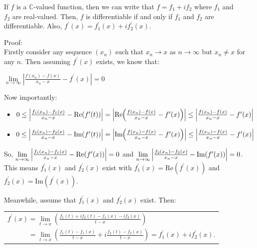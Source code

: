 \documentclass{book}
\newcommand{\exTwo}{%
   \color{RedViolet}%
   \fontsize{13}{15}\selectfont%
}
\newcommand{\exP}{%
   \color{VioletRed}%
   \fontsize{12}{14}\selectfont%
}
\newenvironment{myIndent}{%
   \begin{adjustwidth}{2.5em}{0em}%
}{%
   \end{adjustwidth}%
}
\newcommand{\rea}[1]{\mathrm{Re}(#1)}
\newcommand{\ima}[1]{\mathrm{Im}(#1)}
\newcommand{\retTwo}{\hfill\bigbreak}
\begin{document}
If $f$ is a $\mathbb{C}$-valued function, then we can write that $f = f_1 + if_2$ where $f_1$ and\\ $f_2$ are real-valued. Then, $f$ is differentiable if and only if $f_1$ and $f_2$ are\\ differentiable. Also, $f^\prime(x) = f_1^\prime(x) + if_2^\prime(x)$.\retTwo

{\begin{myIndent}\exTwo\color{Purple}
   Proof:\\
   Firstly consider any sequence $(x_n)$ such that $x_n \rightarrow x$ as $n \rightarrow \infty$ but $x_n \neq x$ for\\ any $n$. Then assuming  $f^\prime(x)$ exists, we know that:

   {\centering $\lim\limits_{n\rightarrow\infty}\left|\frac{f(x_n) - f(x)}{x_n-x} - f^\prime(x)\right| = 0$ \retTwo\par}

   Now importantly:
   {\begin{itemize}\exP\color{RedViolet}
      \item $0 \leq \left|\frac{f_1(x_n) - f_1(x)}{x_n - x} - \rea{f^\prime(t)}\right| = \left|\mathrm{Re}\hspace{-0.24em}\left(\frac{f(x_n) - f(x)}{x_n - x} - f^\prime(x) \right)\right| \leq \left|\frac{f(x_n) - f(x)}{x_n-x} - f^\prime(x)\right|$
      \item $0 \leq \left|\frac{f_2(x_n) - f_2(x)}{x_n - x} - \ima{f^\prime(t)}\right| = \left|\mathrm{Im}\hspace{-0.24em}\left(\frac{f(x_n) - f(x)}{x_n - x} - f^\prime(x) \right)\right| \leq \left|\frac{f(x_n) - f(x)}{x_n-x} - f^\prime(x)\right|$\\
   \end{itemize}}

   So, ${\fontsize{12}{14}\selectfont\lim\limits_{n\rightarrow\infty}\left|\frac{f_1(x_n) - f_1(x)}{x_n-x} - \rea{f^\prime(x)}\right| = 0}$ and ${\fontsize{12}{14}\selectfont\lim\limits_{n\rightarrow\infty}\left|\frac{f_2(x_n) - f_2(x)}{x_n-x} - \ima{f^\prime(x)}\right| = 0}$.\\ [2pt]
   This means $f_1^\prime(x)$ and $f_2^\prime(x)$ exist with $f_1^\prime(x) = \rea{f^\prime(x)}$ and $f_2^\prime(x) = \ima{f^\prime(x)}$.\retTwo

   Meanwhile, assume that $f_1^\prime(x)$ and $f_2^\prime(x)$ exist. Then:

   {\centering\exP\color{RedViolet} 
   \begin{tabular}{l}
      $f^\prime(x) = \lim\limits_{t\rightarrow x}\left(\frac{f_1(t) + if_2(t) - f_1(x) - if_2(x)}{t - x}\right)$\\ [3pt]
      $\phantom{f^\prime(x) } = \lim\limits_{t\rightarrow x}\left(\frac{f_1(t) - f_1(x)}{t - x} + i\frac{f_2(t) - f_2(x)}{t-x}\right) =   f_1^\prime(x) + if_2^\prime(x)$.
   \end{tabular}
   \retTwo\par}
\end{myIndent}}
\end{document}
